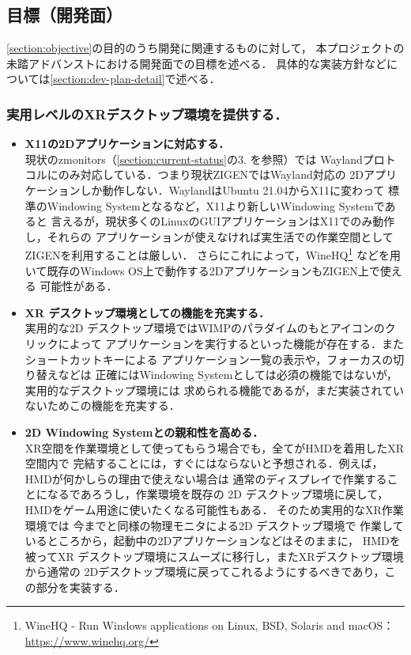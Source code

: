 \subsection{目標（開発面）}
\label{section:dev-goal}

\ref*{section:objective}の目的のうち開発に関連するものに対して，
本プロジェクトの未踏アドバンストにおける開発面での目標を述べる．
具体的な実装方針などについては\ref{section:dev-plan-detail}で述べる．

\subsubsection*{実用レベルのXRデスクトップ環境を提供する．}

\begin{itemize}
  \item \textbf{X11の2Dアプリケーションに対応する．}\\
        現状のzmonitors（\ref{section:current-status}の3. を参照）では %
        Waylandプロトコルにのみ対応している．つまり現状ZIGENではWayland対応の
        2Dアプリケーションしか動作しない．WaylandはUbuntu 21.04からX11に変わって
        標準のWindowing Systemとなるなど，X11より新しいWindowing Systemであると
        言えるが，現状多くのLinuxのGUIアプリケーションはX11でのみ動作し，それらの
        アプリケーションが使えなければ実生活での作業空間としてZIGENを利用することは厳しい．
        さらにこれによって，WineHQ\footnote{WineHQ - Run Windows applications on Linux, BSD, Solaris and macOS：\url{https://www.winehq.org/}}
        などを用いて既存のWindows OS上で動作する2DアプリケーションもZIGEN上で使える
        可能性がある．

  \item \textbf{XR デスクトップ環境としての機能を充実する．}\\
        実用的な2D デスクトップ環境ではWIMPのパラダイムのもとアイコンのクリックによって
        アプリケーションを実行するといった機能が存在する．またショートカットキーによる
        アプリケーション一覧の表示や，フォーカスの切り替えなどは
        正確にはWindowing Systemとしては必須の機能ではないが，実用的なデスクトップ環境には
        求められる機能であるが，まだ実装されていないためこの機能を充実する．

  \item \textbf{2D Windowing Systemとの親和性を高める．}\\
        XR空間を作業環境として使ってもらう場合でも，全てがHMDを着用したXR空間内で
        完結することには，すぐにはならないと予想される．例えば，HMDが何かしらの理由で使えない場合は
        通常のディスプレイで作業することになるであろうし，作業環境を既存の
        2D デスクトップ環境に戻して，HMDをゲーム用途に使いたくなる可能性もある．
        そのため実用的なXR作業環境では 今までと同様の物理モニタによる2D デスクトップ環境で
        作業しているところから，起動中の2Dアプリケーションなどはそのままに，
        HMDを被ってXR デスクトップ環境にスムーズに移行し，またXRデスクトップ環境から通常の
        2Dデスクトップ環境に戻ってこれるようにするべきであり，この部分を実装する．
\end{itemize}

